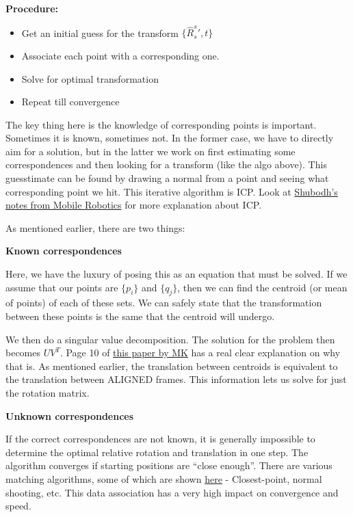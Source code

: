 \textbf{Procedure:}

\begin{itemize}
    \item Get an initial guess for the transform $\{\hat{R}_s^s', t\}$
    \item Associate each point with a corresponding one.
    \item Solve for optimal transformation
    \item Repeat till convergence
\end{itemize}

The key thing here is the knowledge of corresponding points is important. Sometimes it is known, sometimes not. In the former case, we have to directly aim for a solution, but in the latter we work on first estimating some correspondences and then looking for a transform (like the algo above). This guesstimate can be found by drawing a normal from a point and seeing what corresponding point we hit. This iterative algorithm is ICP. Look at \href{https://www.notion.so/Point-Cloud-Registration-Iterative-Closest-Point-a25686ce1a11409d838d47bcac43ab4b}{Shubodh's notes from Mobile Robotics} for more explanation about ICP.

As mentioned earlier, there are two things:

\textbf{Known correspondences}

Here, we have the luxury of posing this as an equation that must be solved. If we assume that our points are $\{p_i\}$ and $\{q_j\}$, then we can find the centroid (or mean of points) of each of these sets. We can safely state that the transformation between these points is the same that the centroid will undergo.

We then do a singular value decomposition. The solution for the problem then becomes $UV^T$. Page 10 of \href{https://arxiv.org/pdf/1705.09785.pdf}{this paper by MK} has a real clear explanation on why that is. As mentioned earlier, the translation between centroids is equivalent to the translation between ALIGNED frames. This information lets us solve for just the rotation matrix.

\textbf{Unknown correspondences}

If the correct correspondences are not known, it is generally impossible to determine the optimal relative rotation and translation in one step. The algorithm converges if starting positions are “close enough”. There are various matching algorithms, some of which are shown \href{https://www.notion.so/Point-Cloud-Registration-Iterative-Closest-Point-a25686ce1a11409d838d47bcac43ab4b#acdbf05aa6834446bc0812b2ae3f0f40}{here} - Closest-point, normal shooting, etc. This data association has a very high impact on convergence and speed.

